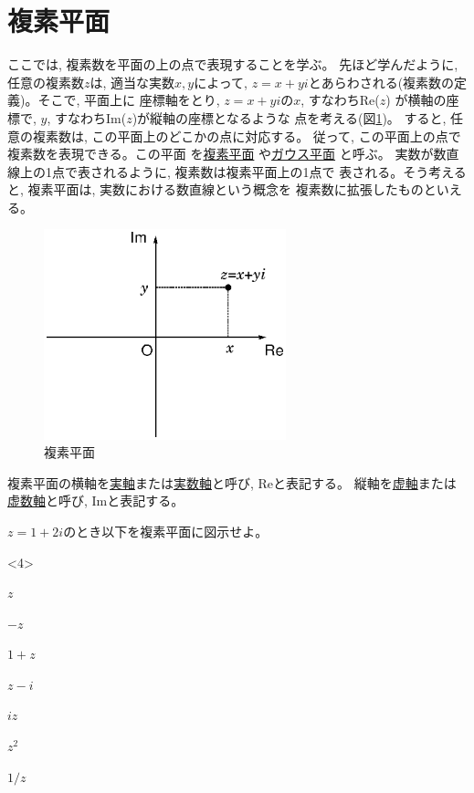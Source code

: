 \section{複素平面}\label{sect:Gauss_plane}

ここでは, 複素数を平面の上の点で表現することを学ぶ。
先ほど学んだように, 任意の複素数$z$は, 適当な実数$x, y$によって, 
$z=x+yi$とあらわされる(複素数の定義)。そこで, 平面上に
座標軸をとり, $z=x+yi$の$x$, すなわちRe($z$)
が横軸の座標で, $y$, すなわちIm($z$)が縦軸の座標となるような
点を考える(図\ref{fig:cplane0})。
すると, 任意の複素数は, この平面上のどこかの点に対応する。
従って, この平面上の点で複素数を表現できる。この平面
を\underline{複素平面}
や\underline{ガウス平面} と呼ぶ。
実数が数直線上の1点で表されるように, 複素数は複素平面上の1点で
表される。そう考えると, 複素平面は, 実数における数直線という概念を
複素数に拡張したものといえる。

\begin{figure}[h]
    \centering
    \includegraphics[width=7cm]{cplane0.eps}
    \caption{複素平面}\label{fig:cplane0}
\end{figure}

複素平面の横軸を\underline{実軸}または\underline{実数軸}と呼び, Reと表記する。
縦軸を\underline{虚軸}または\underline{虚数軸}と呼び, Imと表記する。

\begin{q}\label{q:univ_comp_plane0} $z=1+2i$のとき以下を複素平面に図示せよ。
\begin{edaenumerate}<4>
\item $z$
\item $-z$
\item $1+z$
\item $z-i$
\item $iz$
\item $z^2$
\item $1/z$
\end{edaenumerate}\end{q}

